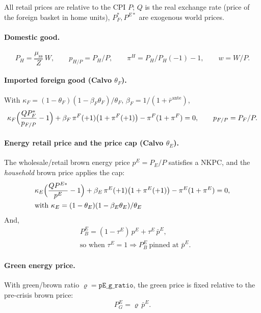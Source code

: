 \documentclass[11pt,a4paper]{article}
\newcommand{\stst}{\mathrm{ss}}
\newcommand{\PEB}{P^{E}_{B}}
\newcommand{\PEG}{P^{E}_{G}}
\newcommand{\pE}{p^{E}}
\begin{document}
All retail prices are relative to the CPI $P$; $Q$ is the real exchange rate
(price of the foreign basket in home units), $P^{*}_{F},P^{E*}$ are exogenous
world prices.

\paragraph{Domestic good.}
\begin{equation}
P_H=\frac{\mu_{\stst}}{Z}\,W,\qquad
p_{H/P}=P_H/P,\qquad
\pi^{H}=P_H/P_H(-1)-1,\qquad w=W/P.
\end{equation}

\paragraph{Imported foreign good (Calvo $\theta_F$).} With
$\kappa_F=(1-\theta_F)(1-\beta_F\theta_F)/\theta_F$, $\beta_F=1/(1+\bar r^{\text{ante}})$,
\begin{equation}
\kappa_F\Bigl(\frac{Q P^{*}_{F}}{p_{F/P}}-1\Bigr)
+\beta_F\,\pi^{F}(+1)\bigl(1+\pi^{F}(+1)\bigr)
-\pi^{F}(1+\pi^{F})=0,\qquad p_{F/P}=P_F/P .
\end{equation}

\paragraph{Energy retail price and the price cap (Calvo $\theta_E$).} The
wholesale/retail brown energy price $\pE=P_E/P$ satisfies a NKPC, and the
\emph{household} brown price applies the cap:
\begin{align}
&\kappa_E\Bigl(\frac{Q P^{E*}}{\pE}-1\Bigr)
+\beta_E\,\pi^{E}(+1)\bigl(1+\pi^{E}(+1)\bigr)
-\pi^{E}(1+\pi^{E})=0,\\
 &\text{with } \kappa_E=(1-\theta_E)(1-\beta_E\theta_E)/\theta_E
\label{eq:cap}
\end{align}
And,
\begin{align}
&\PEB = (1-\tau^{E})\,\pE+\tau^{E}\,\bar\pE,\\
&\text{so when }\tau^{E}=1\Rightarrow \PEB\ \text{pinned at }\bar\pE .
\end{align}

\paragraph{Green energy price.} With green/brown ratio $\varrho=\texttt{pE\_g\_ratio}$,
the green price is fixed relative to the pre-crisis brown price:
\begin{equation}
\PEG=\varrho\,\bar\pE . \label{eq:pEG}
\end{equation}
\end{document}
